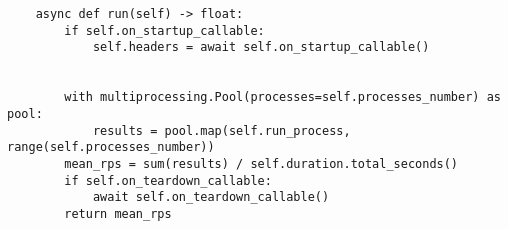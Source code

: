 \begin{lstlisting}
    async def run(self) -> float:
        if self.on_startup_callable:
            self.headers = await self.on_startup_callable()


        with multiprocessing.Pool(processes=self.processes_number) as pool:
            results = pool.map(self.run_process, range(self.processes_number))
        mean_rps = sum(results) / self.duration.total_seconds()
        if self.on_teardown_callable:
            await self.on_teardown_callable()
        return mean_rps
\end{lstlisting}